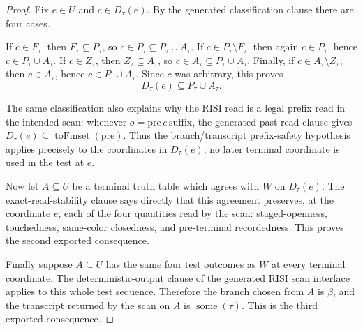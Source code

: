 \begin{proof}
Fix \(e\in U\) and \(c\in D_\tau(e)\).  By the generated classification
clause there are four cases.

If \(c\in F_\tau\), then \(F_\tau\subseteq P_\tau\), so
\(c\in P_\tau\subseteq P_\tau\cup A_\tau\).  If
\(c\in P_\tau\setminus F_\tau\), then again \(c\in P_\tau\), hence
\(c\in P_\tau\cup A_\tau\).  If \(c\in Z_\tau\), then
\(Z_\tau\subseteq A_\tau\), so \(c\in A_\tau\subseteq P_\tau\cup A_\tau\).
Finally, if \(c\in A_\tau\setminus Z_\tau\), then \(c\in A_\tau\), hence
\(c\in P_\tau\cup A_\tau\).  Since \(c\) was arbitrary, this proves
\[
D_\tau(e)\subseteq P_\tau\cup A_\tau .
\]

The same classification also explains why the RISI read is a legal prefix
read in the intended scan: whenever \(o=\mathrm{pre}\,e\,\mathrm{suffix}\),
the generated past-read clause gives
\(D_\tau(e)\subseteq\operatorname{toFinset}(\mathrm{pre})\).  Thus the
branch/transcript prefix-safety hypothesis applies precisely to the
coordinates in \(D_\tau(e)\); no later terminal coordinate is used in the
test at \(e\).

Now let \(A\subseteq U\) be a terminal truth table which agrees with
\(W\) on \(D_\tau(e)\).  The exact-read-stability clause says directly
that this agreement preserves, at the coordinate \(e\), each of the four
quantities read by the scan: staged-openness, touchedness, same-color
closedness, and pre-terminal recordedness.  This proves the second exported
consequence.

Finally suppose \(A\subseteq U\) has the same four test outcomes as \(W\) at
every terminal coordinate.  The deterministic-output clause of the generated
RISI scan interface applies to this whole test sequence.  Therefore the
branch chosen from \(A\) is \(\beta\), and the transcript returned by the
scan on \(A\) is \(\operatorname{some}(\tau)\).  This is the third exported
consequence.
\end{proof}
